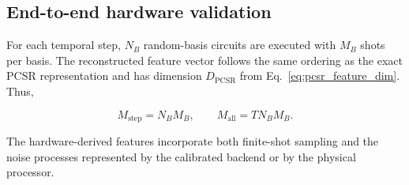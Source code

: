 \documentclass[final,1p,times]{elsarticle}
\begin{document}
\subsection{End-to-end hardware validation}

For each temporal step, $N_B$ random-basis circuits are executed with
$M_B$ shots per basis. The reconstructed feature vector follows the
same ordering as the exact PCSR representation and has dimension
$D_{\mathrm{PCSR}}$ from Eq.~\eqref{eq:pcsr_feature_dim}. Thus,

\begin{equation}
M_{\mathrm{step}}=N_BM_B,
\qquad
M_{\mathrm{all}}=TN_BM_B.
\end{equation}

The hardware-derived features incorporate both finite-shot sampling and
the noise processes represented by the calibrated backend or by the
physical processor.
\end{document}
